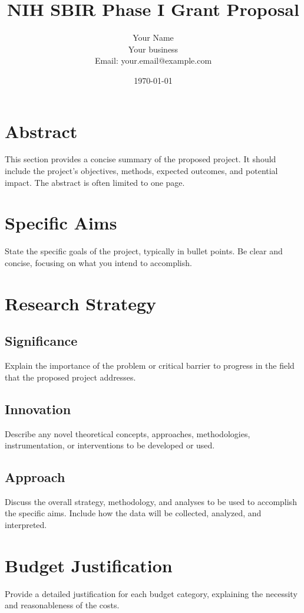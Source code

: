 \documentclass[12pt]{article}
\title{NIH SBIR Phase I Grant Proposal}
\author{Your Name \\ Your business \\ Email: your.email@example.com}
\date{\today}
\begin{document}
\maketitle

\newpage

\section*{Abstract}
This section provides a concise summary of the proposed project. It should include the project's objectives, methods, expected outcomes, and potential impact. The abstract is often limited to one page.

\newpage

\section{Specific Aims}
State the specific goals of the project, typically in bullet points. Be clear and concise, focusing on what you intend to accomplish.

\newpage

\section{Research Strategy}
\subsection{Significance}
Explain the importance of the problem or critical barrier to progress in the field that the proposed project addresses.

\subsection{Innovation}
Describe any novel theoretical concepts, approaches, methodologies, instrumentation, or interventions to be developed or used.

\subsection{Approach}
Discuss the overall strategy, methodology, and analyses to be used to accomplish the specific aims. Include how the data will be collected, analyzed, and interpreted.

\newpage

\section{Budget Justification}
Provide a detailed justification for each budget category, explaining the necessity and reasonableness of the costs.
\end{document}
